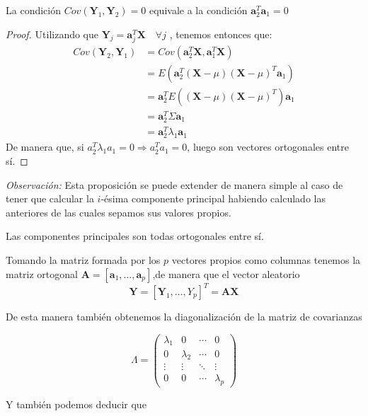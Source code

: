 \begin{propo}
La condición $Cov(\textbf{Y}_1,\textbf{Y}_2)=0 $ equivale a la condición $\textbf{a}_2^T\textbf{a}_1 = 0$
\end{propo}
\begin{proof}
Utilizando que $\textbf{Y}_j=\textbf{a}_j^T \textbf{X}\quad \forall j$ , tenemos entonces que:
\begin{align*}
Cov(\textbf{Y}_2,\textbf{Y}_1)&= Cov (\textbf{a}_2^T\textbf{X},\textbf{a}_1^T\textbf{X})\\ 
&= E(\textbf{a}_2^T(\textbf{X}-\mu)(\textbf{X}-\mu)^T \textbf{a}_1)\\
&= \textbf{a}_2^T E((\textbf{X}-\mu)(\textbf{X}-\mu)^T) \textbf{a}_1\\
&= \textbf{a}_2^T \Sigma \textbf{a}_1 \\
&= \textbf{a}_2^T \lambda_1 \textbf{a}_1
\end{align*}
\noindent De manera que, si $a_2^T \lambda_1 a_1 = 0 \Rightarrow a_2^T a_1=0 $, luego son vectores ortogonales entre sí.
\end{proof}

\noindent \emph{Observación: } Esta proposición se puede extender de manera simple al caso de tener que calcular la $i$-ésima componente principal habiendo calculado las anteriores de las cuales sepamos sus valores propios. 

\begin{coro}
Las componentes principales son todas ortogonales entre sí. 
\end{coro}

\noindent Tomando la matriz formada por los $p$ vectores propios como columnas tenemos la matriz ortogonal $\textbf{A}=[\textbf{a}_1,\ldots, \textbf{a}_p]$,de manera que el vector aleatorio 
$$\textbf{Y}=[\textbf{Y}_1,\ldots , Y_p]^T=\textbf{A}\textbf{X}$$

De esta manera también obtenemos la diagonalización de la matriz de covarianzas 

\begin{equation}
\Lambda=\begin{pmatrix}
\lambda_1 & 0 & \cdots & 0\\
0 & \lambda_2 & \cdots & 0\\
\vdots & \vdots & \ddots & \vdots\\
0 & 0 & \cdots & \lambda_p
\end{pmatrix}
\end{equation}

Y también podemos deducir que 

